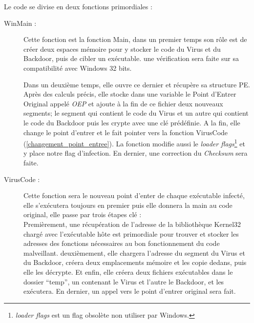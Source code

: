    Le code se divise en deux fonctions primordiales :
    \begin{description}
        \item[WinMain :] Cette fonction est la fonction Main, dans un premier temps son rôle est de créer 
        deux espaces mémoire pour y stocker le code du Virus et du Backdoor, puis de cibler un exécutable. 
        une vérification sera faite sur sa compatibilité avec Windows 32 bits.

        Dans un deuxième temps, elle ouvre ce dernier et récupère sa structure PE. Après des calculs précis, 
        elle stocke dans une variable le Point d’Entrer Original appelé \emph{OEP} et ajoute à la fin de ce 
        fichier deux nouveaux segments; le segment qui contient le code du Virus et un autre qui contient 
        le code du Backdoor puis les crypte avec une clé prédéfinie. A la fin, elle 
        change le point d’entrer et le fait pointer vers la fonction VirusCode (\autoref{changement_point_entree}).
        La fonction modifie aussi le \emph{loader flags}\footnote{\emph{loader flags} est un flag obsolète non
        utiliser par Windows.} et y place notre flag d'infection. En dernier, une correction du \emph{Checksum}
        sera faite.
        
        \item[VirusCode :] Cette fonction sera le nouveau point d’enter de chaque exécutable infecté, 
            elle s’exécutera toujours en premier puis elle donnera la main au code original, 
            elle passe par trois étapes clé : \\
            Premièrement, une récupération de l'adresse de la bibliothèque Kernel32 chargé avec l'exécutable 
            hôte est primordiale pour trouver et stocker les adresses des fonctions  nécessaires au bon 
            fonctionnement du code malveillant.
            deuxièmement, elle chargera l’adresse du segment du Virus et du Backdoor, créera deux 
            emplacements mémoire et les copie dedans, puis elle les décrypte.
            Et enfin, elle créera deux fichiers exécutables dans le dossier “temp”, un contenant le Virus et 
            l’autre le Backdoor, et les exécutera. En dernier, un appel vers le point d’entrer original sera fait.

    \end{description}

